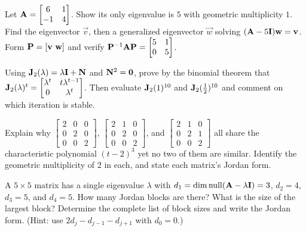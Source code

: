 \begin{exercise}
\label{ch28:ex-chain}
Let $\mathbf{A}=\begin{bmatrix}6&1\\-1&4\end{bmatrix}$. Show its only eigenvalue is $5$ with
geometric multiplicity $1$. Find the eigenvector $\vec{v}$, then a generalized
eigenvector $\vec{w}$ solving $(\mathbf{A}-5\mathbf{I})\mathbf{w}=\mathbf{v}$. Form
$\mathbf{P}=[\mathbf{v}\ \mathbf{w}]$ and verify $\mathbf{P}^{-1}\mathbf{A}\mathbf{P}=\begin{bmatrix}5&1\\0&5\end{bmatrix}$.
\end{exercise}

\begin{exercise}
\label{ch28:ex-powers}
Using $\mathbf{J}_2(\lambda)=\lambda\mathbf{I}+\mathbf{N}$ and $\mathbf{N}^2=\mathbf{0}$, prove by the
binomial theorem that $\mathbf{J}_2(\lambda)^t=\begin{bmatrix}\lambda^t & t\lambda^{t-1}\\
0&\lambda^t\end{bmatrix}$. Then evaluate $\mathbf{J}_2(1)^{10}$ and $\mathbf{J}_2(\tfrac12)^{10}$
and comment on which iteration is stable.
\end{exercise}

\begin{exercise}
\label{ch28:ex-notsimilar}
Explain why $\begin{bmatrix}2&0&0\\0&2&0\\0&0&2\end{bmatrix}$,
$\begin{bmatrix}2&1&0\\0&2&0\\0&0&2\end{bmatrix}$, and
$\begin{bmatrix}2&1&0\\0&2&1\\0&0&2\end{bmatrix}$ all share the characteristic polynomial
$(t-2)^3$ yet no two of them are similar. Identify the geometric multiplicity of $2$ in
each, and state each matrix's Jordan form.
\end{exercise}

\begin{exercise}
\label{ch28:ex-nullities}
A $5\times5$ matrix has a single eigenvalue $\lambda$ with
$d_1=\operatorname{dim}\operatorname{null}(\mathbf{A}-\lambda\mathbf{I})=3$, $d_2=4$, $d_3=5$, and $d_4=5$. How many
Jordan blocks are there? What is the size of the largest block? Determine the complete
list of block sizes and write the Jordan form. (Hint: use
$2d_j-d_{j-1}-d_{j+1}$ with $d_0=0$.)
\end{exercise}

